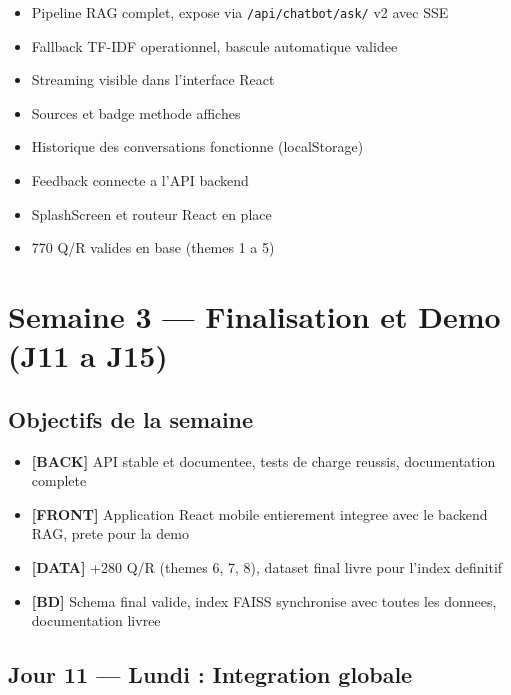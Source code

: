 \documentclass[11pt,a4paper]{article}
\renewcommand{\checkmark}{\ding{52}}
\newcommand{\back}{\textcolor{ragcolor}{\textbf{[BACK]}}}
\newcommand{\front}{\textcolor{reactcolor}{\textbf{[FRONT]}}}
\newcommand{\datas}{\textcolor{datacolor}{\textbf{[DATA]}}}
\newcommand{\db}{\textcolor{dbcolor}{\textbf{[BD]}}}
\begin{document}
\begin{phase2box}
\begin{itemize}
    \item[\checkmark] Pipeline RAG complet, expose via \texttt{/api/chatbot/ask/} v2 avec SSE
    \item[\checkmark] Fallback TF-IDF operationnel, bascule automatique validee
    \item[\checkmark] Streaming visible dans l'interface React
    \item[\checkmark] Sources et badge methode affiches
    \item[\checkmark] Historique des conversations fonctionne (localStorage)
    \item[\checkmark] Feedback connecte a l'API backend
    \item[\checkmark] SplashScreen et routeur React en place
    \item[\checkmark] 770 Q/R valides en base (themes 1 a 5)
\end{itemize}
\end{phase2box}

\clearpage

\section{Semaine 3 --- Finalisation et Demo (J11 a J15)}

\subsection*{Objectifs de la semaine}
\begin{itemize}
    \item \back{} API stable et documentee, tests de charge reussis, documentation complete
    \item \front{} Application React mobile entierement integree avec le backend RAG, prete pour la demo
    \item \datas{} +280 Q/R (themes 6, 7, 8), dataset final livre pour l'index definitif
    \item \db{} Schema final valide, index FAISS synchronise avec toutes les donnees, documentation livree
\end{itemize}

\subsection{Jour 11 --- Lundi : Integration globale}
\end{document}
